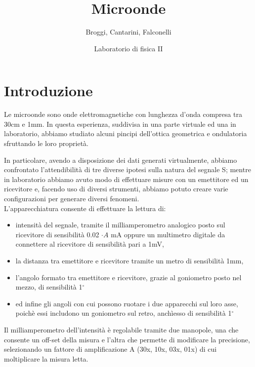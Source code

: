 \documentclass{article}
\title{Microonde}
\author{Broggi, Cantarini, Falconelli}
\date{Laboratorio di fisica II}
\theoremstyle{definition}
\begin{document}
\maketitle


\section{Introduzione}%


Le microonde sono onde elettromagnetiche con lunghezza d'onda compresa tra 30cm e 1mm. In questa esperienza, suddivisa in una parte virtuale ed una in laboratorio, abbiamo studiato alcuni pincipi dell'ottica geometrica e ondulatoria sfruttando le loro proprietà.

In particolare, avendo a disposizione dei dati generati virtualmente, abbiamo confrontato l'attendibilità di tre diverse ipotesi sulla natura del segnale S; mentre in laboratorio abbiamo avuto modo di effettuare misure con un emettitore ed un ricevitore e, facendo uso di diversi strumenti, abbiamo potuto creare varie configurazioni per generare diversi fenomeni.\\
L'apparecchiatura consente di effettuare la lettura di: 
\begin{itemize}
    \item intensità del segnale, tramite il milliamperometro analogico posto sul ricevitore di sensibilità 0.02 \(\cdot A\) mA oppure un multimetro digitale da connettere al ricevitore di sensibilità pari a 1mV,
    \item la distanza tra emettitore e ricevitore tramite un metro di sensibilità 1mm,
    \item l'angolo formato tra emettitore e ricevitore, grazie al goniometro posto nel mezzo, di sensibilità 1\(^{\circ}\)
    \item ed infine gli angoli con cui possono ruotare i due apparecchi sul loro asse, poichè essi includono un goniometro sul retro, anchìesso di sensibilità 1\(^{\circ}\)
\end{itemize}

Il milliamperometro dell'intensità è regolabile tramite due manopole, una che consente un off-set della misura e l'altra che permette di modificare la precisione, selezionando un fattore di amplificazione A (30x, 10x, 03x, 01x) di cui moltiplicare la misura letta.
\end{document}
